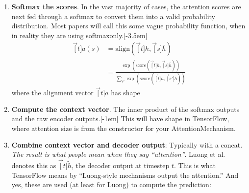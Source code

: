 \documentclass[11pt]{article}
\begin{document}
\begin{enumerate}
	\item \textbf{Softmax the scores}. In the vast majority of cases, the attention scores are next fed through a softmax to convert them into a valid probability distribution. Most papers will call this some vague probability function, when in reality they are using softmaxonly.
	\begin{align}
	\vec[t]{a}(s) &= \text{align}(\vec[t]{h}, \vec[s]{\bar h}) \\
	&= \frac{\exp(\text{score}(\vec[t]{h}, \vec[s]{\bar h}) )}{
		\sum_{s'} \exp(\text{score}(\vec[t]{h}, \vec[s']{\bar h}) )
	}
	\end{align}
	where the alignment vector $\vec[t]{a}$ has shape 
	
	\item \textbf{Compute the context vector}. The inner product of the softmax outputs and the raw encoder outputs.[-1em]
	This will have shape  in TensorFlow, where attention size is from the constructor for your AttentionMechanism.
	
	\item \textbf{Combine context vector and decoder output}: Typically with a concat. \textit{The result is what people mean when they say ``attention''}. Luong et al. denotes this as $\vec[t]{\tilde h}$, the decoder output at timestep $t$. This is what TensorFlow means by ``Luong-style mechanisms output the attention.'' And yes, these are used (at least for Luong) to compute the prediction:
\end{enumerate}
\end{document}

